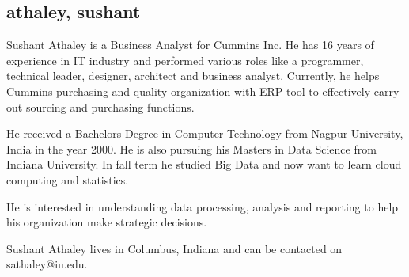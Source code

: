 \subsection{athaley, sushant}
Sushant Athaley is a Business Analyst for Cummins Inc. He has 16 years of experience in IT industry and performed various roles like a programmer, technical leader, designer, architect and business analyst. Currently, he helps Cummins purchasing and quality organization with ERP tool to effectively carry out sourcing and purchasing functions.

He received a Bachelors Degree in Computer Technology from Nagpur University, India in the year 2000. He is also pursuing his Masters in Data Science from Indiana University. In fall term he studied Big Data and now want to learn cloud computing and statistics.

He is interested in understanding data processing, analysis and reporting to help his organization make strategic decisions.

Sushant Athaley lives in Columbus, Indiana and can be contacted on sathaley@iu.edu.
